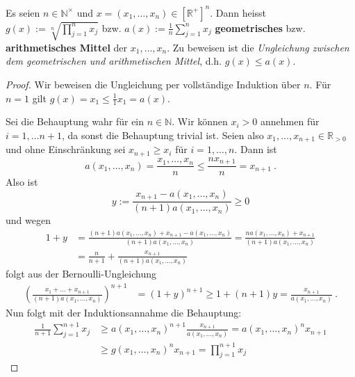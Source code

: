 \setcounter{aufgabe}{9}
\begin{aufgabe}
	Es seien $n \in \mathbb N^\times$ und $x = (x_1, \ldots, x_n) \in \left[ \mathbb R^+ \right]^n$.
	Dann heisst $g(x) := \sqrt[n]{\prod_{j=1}^n x_j}$ bzw. $a(x) := \frac 1 n \sum_{j=1}^n x_j$
	\textbf{geometrisches} bzw. \textbf{arithmetisches Mittel} der $x_1, \ldots, x_n$. Zu beweisen
	ist die \textit{Ungleichung zwischen dem geometrischen und arithmetischen Mittel}, d.h.
	$g(x) \leq a(x)$.
\end{aufgabe}
\begin{proof}
Wir beweisen die Ungleichung per vollständige Induktion über $n$. Für $n = 1$ gilt
$g(x) = x_1 \leq \frac 1 1 x_1 = a(x)$.

Sei die Behauptung wahr für ein $n \in \mathbb N$. Wir können $x_i > 0$ annehmen für
$i = 1, \ldots n+1$, da sonst die Behauptung trivial ist. Seien also $x_1, \ldots, x_{n+1} 
\in \mathbb R_{>0}$ und ohne Einschränkung sei $x_{n+1} \geq x_i$ für $i = 1, \ldots, n$.
Dann ist
\[
	a(x_1, \ldots, x_n) = \frac{x_1, \ldots, x_n}{n}
		\leq \frac{n x_{n+1}}{n}
		= x_{n+1} \ .
\]
Also ist
\[
	y := \frac{ x_{n+1} - a(x_1, \ldots, x_n) }{(n+1) a(x_1, \ldots, x_n)} \geq 0
\]
und wegen
\begin{align*}
	1 + y
		&= \frac{ (n+1) a(x_1, \ldots, x_n) + x_{n+1} - a(x_1, \ldots, x_n)}{(n+1) a(x_1, \ldots, x_n)}
		= \frac{n a(x_1, \ldots, x_n) + x_{n+1}}{(n+1) a(x_1, \ldots, x_n)} \\
		&= \frac{n}{n+1} + \frac{x_{n+1}}{(n+1) a(x_1, \ldots, x_n)}
\end{align*}
folgt aus der Bernoulli-Ungleichung
\begin{align*}
	\left( \frac{x_1 + \ldots + x_{n+1}}{ (n+1) a(x_1, \ldots, x_n)} \right)^{n+1}
	&= (1 + y)^{n+1} \geq 1 + (n+1) y = \frac{x_{n+1}}{a(x_1, \ldots, x_n)} \ .
\end{align*}
Nun folgt mit der Induktionsannahme die Behauptung:
\begin{align*}
	\frac{1}{n+1} \sum_{j=1}^{n+1} x_j
	&\geq a(x_1, \ldots, x_n)^{n+1} \frac{x_{n+1}}{a(x_1, \ldots, x_n)}
	= a(x_1, \ldots, x_n)^n x_{n+1} \\
	&\geq g(x_1, \ldots, x_n)^n x_{n+1} = \prod_{j=1}^{n+1} x_j
\end{align*}
\end{proof}

